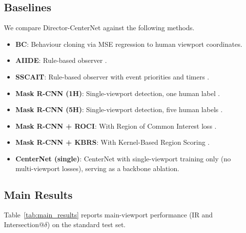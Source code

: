 \documentclass[preprint,12pt]{elsarticle}
\begin{document}
\subsection{Baselines}

We compare Director-CenterNet against the following methods.

\begin{itemize}
  \item \textbf{BC}: Behaviour cloning via MSE regression to human viewport 
        coordinates.
  \item \textbf{AIIDE}: Rule-based observer \cite{mattsson2015automatic}.
  \item \textbf{SSCAIT}: Rule-based observer with event priorities and timers 
        \cite{mattsson2015automatic}.
  \item \textbf{Mask R-CNN (1H)}: Single-viewport detection, one human label 
        \cite{joo2023learning}.
  \item \textbf{Mask R-CNN (5H)}: Single-viewport detection, five human labels 
        \cite{joo2023learning}.
  \item \textbf{Mask R-CNN + ROCI}: With Region of Common Interest loss 
        \cite{joo2023learning}.
  \item \textbf{Mask R-CNN + KBRS}: With Kernel-Based Region Scoring 
        \cite{anonymous2025kbrs}.
  \item \textbf{CenterNet (single)}: CenterNet with single-viewport training 
        only (no multi-viewport losses), serving as a backbone ablation.
\end{itemize}

\subsection{Main Results}

Table~\ref{tab:main_results} reports main-viewport performance (IR and 
Intersection@$\delta$) on the standard test set.
\end{document}
